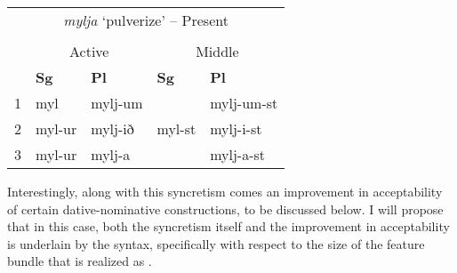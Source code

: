 \documentclass[output=paper,colorlinks,citecolor=brown,
]{langscibook}
\let\singlespacing\relax
\begin{document}
\ea \label{woodxes} \singlespacing
    \begin{tabular}[t]{l|l|l|||l|l} 
        \multicolumn{5}{c}{\textit{mylja} `pulverize' -- Present} \\
        \multicolumn{5}{c}{} \\
         & \multicolumn{2}{c}{Active} & \multicolumn{2}{c}{Middle} \\ 
        \hline
          & \textbf{Sg} & \textbf{Pl}  & \textbf{Sg} & \textbf{Pl} \\
          \hline\hline
        1 & myl & mylj-um  	&  			&  mylj-um-st \\
        2 & myl-ur & mylj-ið 		& myl-st 	&  mylj-i-st  \\
        3 & myl-ur  & mylj-a 		& 		& mylj-a-st  \\
    \end{tabular}
\z
Interestingly, along with this syncretism comes an improvement in acceptability of certain dative-nominative constructions, to be discussed below. I will propose that in this case, both the syncretism itself and the improvement in acceptability is underlain by the syntax, specifically with respect to the size of the feature bundle that is realized as \stin. %






\end{document}
